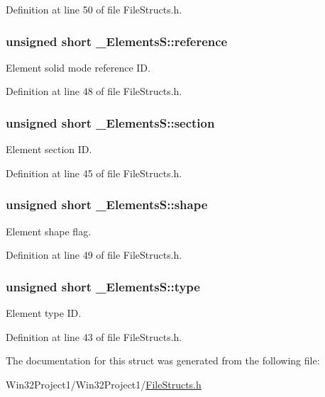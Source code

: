 Definition at line 50 of file File\+Structs.\+h.

\subsubsection[{\texorpdfstring{reference}{reference}}]{\setlength{\rightskip}{0pt plus 5cm}unsigned short \+\_\+\+Elements\+S\+::reference}\hypertarget{struct___elements_s_af9fa947d626f4bcdcb030fe4fab611c4}{}\label{struct___elements_s_af9fa947d626f4bcdcb030fe4fab611c4}


Element solid mode reference ID. 



Definition at line 48 of file File\+Structs.\+h.

\subsubsection[{\texorpdfstring{section}{section}}]{\setlength{\rightskip}{0pt plus 5cm}unsigned short \+\_\+\+Elements\+S\+::section}\hypertarget{struct___elements_s_a76160d7f046c6435586e878eb1ec93b4}{}\label{struct___elements_s_a76160d7f046c6435586e878eb1ec93b4}


Element section ID. 



Definition at line 45 of file File\+Structs.\+h.

\subsubsection[{\texorpdfstring{shape}{shape}}]{\setlength{\rightskip}{0pt plus 5cm}unsigned short \+\_\+\+Elements\+S\+::shape}\hypertarget{struct___elements_s_aff93e58a2996c7dcae7441a7d6804da0}{}\label{struct___elements_s_aff93e58a2996c7dcae7441a7d6804da0}


Element shape flag. 



Definition at line 49 of file File\+Structs.\+h.

\subsubsection[{\texorpdfstring{type}{type}}]{\setlength{\rightskip}{0pt plus 5cm}unsigned short \+\_\+\+Elements\+S\+::type}\hypertarget{struct___elements_s_ac4a61d8b7016a4a60a6e9f9b90904a93}{}\label{struct___elements_s_ac4a61d8b7016a4a60a6e9f9b90904a93}


Element type ID. 



Definition at line 43 of file File\+Structs.\+h.



The documentation for this struct was generated from the following file\+:\begin{DoxyCompactItemize}
\item 
Win32\+Project1/\+Win32\+Project1/\hyperlink{_file_structs_8h}{File\+Structs.\+h}\end{DoxyCompactItemize}
